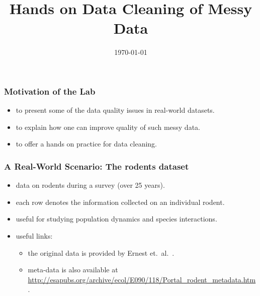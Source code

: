 \documentclass{beamer}					%
\title{Hands on Data Cleaning of Messy Data}	%
\date{\today}									%
\begin{document}
\begin{frame}
  \titlepage
\end{frame}
   

 \begin{frame}[c]
  \frametitle{Motivation of the Lab}
 \begin{itemize}
 \item to present some of the data quality issues in real-world datasets.
 \item to explain how one can improve quality of such messy data.
 \item to offer a hands on practice for data cleaning.
 \end{itemize}
 \end{frame}
   
 \begin{frame}[c]
 \frametitle{A Real-World Scenario: The rodents dataset}
 \begin{itemize}
 \item data on rodents during a survey (over 25 years).
 \item each row denotes the information collected on an individual rodent.
 \item useful for studying population dynamics and species interactions.
 \item useful links:
 \begin{itemize}
 \item the original data is provided by Ernest et.\ al.\ \cite{Ernest2018}. 
 \item meta-data is also available at \footnotesize{\url{http://esapubs.org/archive/ecol/E090/118/Portal\_rodent\_metadata.htm}}.
  \end{itemize}
 \end{itemize}
 \end{frame}
 
\end{document}
